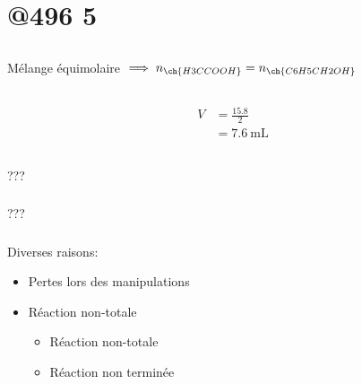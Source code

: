 \documentclass{article}
\let\ce\ch
\begin{document}
\section{@496 5}

\subsection{}

\newcommand{\ethano}{\ce{H3CCOOH}}
\newcommand{\alcbenz}{\ce{C6H5CH2OH}}
Mélange équimolaire $\implies n_{\ethano} = n_{\alcbenz}$ 


\subsection{}

\begin{equation*}
	\begin{split}
		V &= \frac{15.8}{2} \\
		  &= \SI{7.6}{\milli\liter}
	\end{split}
\end{equation*}

\subsection{}
\subsubsection{}
??? 

\subsubsection{}
???
\subsubsection{}
Diverses raisons:

\begin{itemize}
	\item Pertes lors des manipulations
	\item Réaction non-totale
	\begin{itemize}
		\item Réaction non-totale
		\item Réaction non terminée
	\end{itemize}
\end{itemize}
\end{document}
